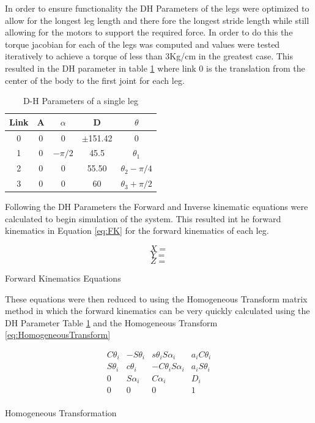 \documentclass[conference]{IEEEtran}
\begin{document}
In  order to ensure functionality the DH Parameters of the legs were optimized to allow for the longest leg length and there fore the longest stride length while still allowing for the motors to support the required force. In order to do this the torque jacobian for each of the legs was computed and  values were tested iteratively to achieve a torque of less than 3Kg/cm in the greatest case. This resulted in the DH parameter in table \ref{tab:DHParametersLeg} where link 0 is the translation from the center of the body to the first joint for each leg. 
\begin{table}[H]
    \centering
    \begin{tabular}{|c|c|c|c|c|}
    \hline
    Link& A  & $\alpha$ & D & $\theta$ \\
    \hline     
        0 &  0 & 0 & $\pm$151.42 &0\\
        1 &  0 & $-\pi/2$ & 45.5  &$\theta_1$\\
        2 &  0 & 0& 55.50 & $\theta_2-\pi/4$\\
        3 & 0  &0 & 60  &$\theta_3+\pi/2$\\
    \hline
    \end{tabular}
        \caption{\label{tab:DHParametersLeg}D-H Parameters of a single leg}
    \end{table}
    Following the DH Parameters the Forward and Inverse kinematic equations were calculated to begin simulation of the system. This resulted int he forward kinematics in Equation \ref{eq:FK} for the forward kinematics of each leg.
\begin{eqfloat}[H]
    \begin{equation}
        X = 
        \label{FK:X}
    \end{equation}
    \begin{equation}
        Y = 
        \label{FK:Y}
    \end{equation}
    \begin{equation}
        Z = 
        \label{FK:Z}
    \end{equation}
    \setcounter{equation}{0}
    \caption{\label{eq:FK}Forward Kinematics Equations}
    \end{eqfloat}
    These equations were then reduced to using the Homogeneous Transform matrix method in which the forward kinematics can be very quickly calculated using the DH Parameter Table \ref{tab:DHParametersLeg} and the Homogeneous Transform \ref{eq:HomogeneousTransform}
    \begin{eqfloat}[H]
        \centering
        $$
        \begin{matrix}
        C\theta_i & -S\theta_i & s\theta_iS\alpha_i &a_iC\theta_i\\
        S\theta_i& c\theta_i & -C\theta_iS\alpha_i & a_iS\theta_i\\
        0 & S\alpha_i & C\alpha_i & D_i\\
        0 & 0 & 0 & 1\\
        \end{matrix}
        $$
    \caption{\label{eq:HomogeneousTransform}Homogeneous Transformation}
    \end{eqfloat}
\end{document}
